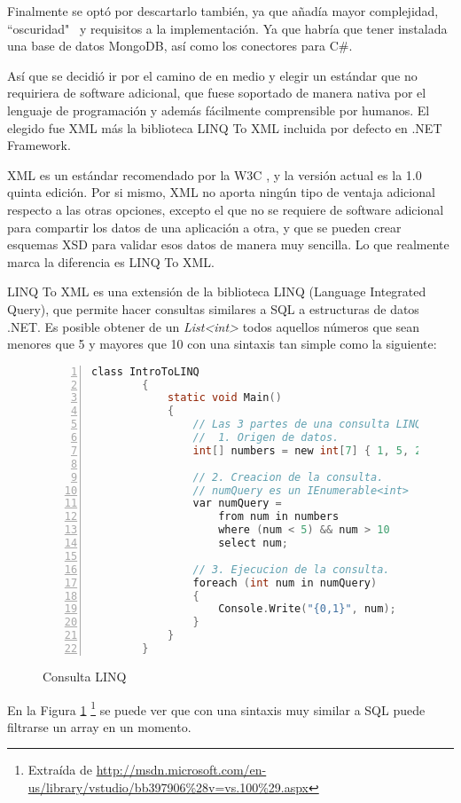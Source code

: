 Finalmente se opt\'o por descartarlo tambi\'en, ya que a\~nad\'ia mayor complejidad, ``oscuridad" \ y requisitos a la 
implementaci\'on. Ya que habr\'ia que tener instalada una base de datos MongoDB, as\'i como los conectores para
C\#.

As\'i que se decidi\'o ir por el camino de en medio y elegir un est\'andar que no requiriera de software adicional,
que fuese soportado de manera nativa por el lenguaje de programaci\'on y adem\'as f\'acilmente comprensible por
humanos. El elegido fue XML m\'as la biblioteca LINQ To XML incluida por defecto en .NET Framework. 

XML es un est\'andar recomendado por la W3C \cite{XML:Specification}, y la versi\'on actual es la 1.0 quinta edici\'on.
Por si mismo, XML no aporta ning\'un tipo de ventaja adicional respecto a las otras opciones, excepto el que no se
requiere de software adicional para compartir los datos de una aplicaci\'on a otra, y que
se pueden crear esquemas XSD para validar esos datos de manera muy sencilla. 
Lo que realmente marca
la diferencia es LINQ To XML.

LINQ To XML es una extensi\'on de la biblioteca LINQ (Language Integrated Query), que permite hacer consultas
similares a SQL a estructuras de datos .NET. Es posible obtener de un \emph{List<int>} todos aquellos n\'umeros
que sean menores que 5 y mayores que 10 con una sintaxis tan simple como la siguiente:

\begin{figure}[H]
	\begin{lstlisting}[tabsize=2, language=C, numbers=left, showspaces=false, breaklines=true]
		class IntroToLINQ
		{        
			static void Main()
			{
				// Las 3 partes de una consulta LINQ:
				//  1. Origen de datos.
				int[] numbers = new int[7] { 1, 5, 20, -4, 7, 8, 9};
				
				// 2. Creacion de la consulta.
				// numQuery es un IEnumerable<int>
				var numQuery =
					from num in numbers
					where (num < 5) && num > 10
					select num;
				
				// 3. Ejecucion de la consulta.
				foreach (int num in numQuery)
				{
					Console.Write("{0,1}", num);
				}
			}
		}
	\end{lstlisting}
	\caption[Consulta LINQ]{Consulta LINQ}
	\label{Consulta LINQ}
\end{figure}

En la Figura \ref{Consulta LINQ}
\footnote{Extra\'ida de \url{http://msdn.microsoft.com/en-us/library/vstudio/bb397906\%28v=vs.100\%29.aspx}}
se puede ver que con una sintaxis muy similar a SQL puede filtrarse un array en un momento.


